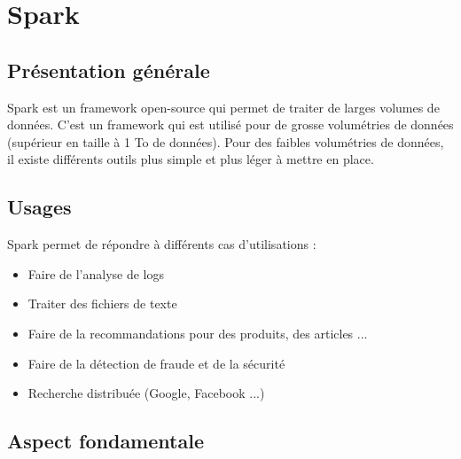 \section{Spark}

\subsection{Présentation générale}

Spark est un framework open-source qui permet de traiter de larges volumes de données. C'est un framework qui est utilisé pour de grosse volumétries de données (supérieur en taille à 1 To de données). Pour des faibles volumétries de données, il existe différents outils plus simple et plus léger à mettre en place.

\subsection{Usages}

Spark permet de répondre à différents cas d'utilisations :
\newline
\begin{itemize}
  \item Faire de l'analyse de logs
  \item Traiter des fichiers de texte
  \item Faire de la recommandations pour des produits, des articles ...
  \item Faire de la détection de fraude et de la sécurité
  \item Recherche distribuée (Google, Facebook ...)
\end{itemize}

\subsection{Aspect fondamentale}


